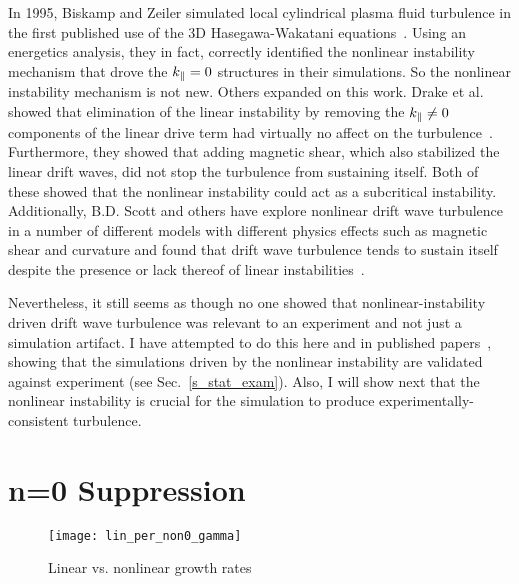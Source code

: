 In 1995, Biskamp and Zeiler simulated local cylindrical plasma fluid turbulence in the first published use of the 3D Hasegawa-Wakatani equations~\cite{biskamp1995}. 
Using an energetics analysis, they in fact, correctly identified the nonlinear instability mechanism that drove the $k_\parallel=0$ structures in their simulations. So the nonlinear instability
mechanism is not new. Others expanded on this work. Drake et al. showed that elimination of the linear instability by removing the $k_\parallel \ne 0$ components of the linear drive term
had virtually no affect on the turbulence~\cite{drake1995}. Furthermore, they showed that adding magnetic shear, which also stabilized the linear drift waves, did not stop the turbulence
from sustaining itself. Both of these showed that the nonlinear instability could act as a subcritical instability.
Additionally, B.D. Scott and others have explore nonlinear drift wave turbulence in a number of different models with different physics effects such as magnetic shear and curvature
and found that drift wave turbulence tends to sustain itself despite the presence or lack thereof of linear 
instabilities~\cite{scott1990,scott1992,zeiler1996,zeiler1997,korsholm1999,scott2002,scott2003,scott2005}.

Nevertheless, it still seems as though no one showed that nonlinear-instability driven drift wave turbulence was relevant to an experiment and not just a simulation artifact. I have attempted
to do this here and in published papers~\cite{friedman2012b,friedman2013},
showing that the simulations driven by the nonlinear instability are validated against experiment (see Sec.~\ref{s_stat_exam}). Also, I will show next that the nonlinear instability
is crucial for the simulation to produce experimentally-consistent turbulence.


\section{n=0 Suppression}
\label{s_n0_supp}

\begin{figure}[!ht]
\centerline{\texttt{[image: lin\_per\_non0\_gamma]}}
\caption{Linear vs. nonlinear growth rates}
\label{lin_per_non0_gamma}
\end{figure}
